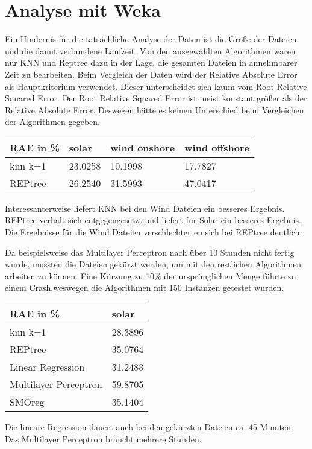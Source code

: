 \documentclass[letterpaper]{article} %
\begin{document}
\section*{Analyse mit Weka}
    Ein Hindernis für die tatsächliche Analyse der Daten ist die Größe der Dateien und die damit verbundene Laufzeit. Von den ausgewählten Algorithmen waren nur KNN und Reptree dazu in der Lage, die gesamten Dateien in annehmbarer Zeit zu bearbeiten.
    Beim Vergleich der Daten wird der Relative Absolute Error als Hauptkriterium verwendet. Dieser unterscheidet sich kaum vom Root Relative Squared Error. Der Root Relative Squared Error ist meist konstant größer als der Relative Absolute Error. Deswegen hätte es keinen Unterschied beim Vergleichen der Algorithmen gegeben.
    \hfill\break
    \begin{center}
        \begin{tabular}{|l||l|l|l|}
            \hline
            RAE in \%&solar&wind onshore&wind offshore\\
            \hline
            \hline
            knn k=1&23.0258&10.1998&17.7827\\
            \hline
            REPtree&26.2540&31.5993&47.0417\\
            \hline
        \end{tabular}
    \end{center}
    \hfill\break
    Interessanterweise liefert KNN bei den Wind Dateien ein besseres Ergebnis. REPtree verhält sich entgegengesetzt und liefert für Solar ein besseres Ergebnis. Die Ergebnisse für die Wind Dateien verschlechterten sich bei REPtree deutlich. 

    Da beispielsweise das Multilayer Perceptron nach über 10 Stunden nicht fertig wurde, mussten die Dateien gekürzt werden, um mit den restlichen Algorithmen arbeiten zu können. Eine Kürzung zu 10\% der ursprünglichen Menge führte zu einem Crash,weswegen die Algorithmen mit 150 Instanzen getestet wurden. 
    \hfill\break
    \begin{center}
        \begin{tabular}{|l||l|}
            \hline
            RAE in \%&solar\\
            \hline
            \hline
            knn k=1&28.3896\\
            \hline
            REPtree&35.0764\\
            \hline
            Linear Regression&31.2483\\
            \hline
            Multilayer Perceptron&59.8705\\
            \hline
            SMOreg&35.1404\\
            \hline
        \end{tabular}
    \end{center}
    \hfill\break
    Die lineare Regression dauert auch bei den gekürzten Dateien ca. 45 Minuten. Das Multilayer Perceptron braucht mehrere Stunden.
\end{document}
